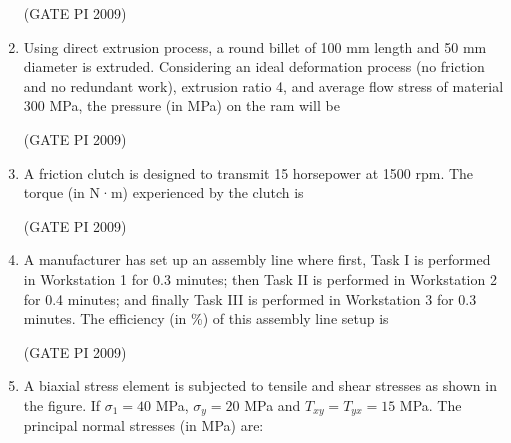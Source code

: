 \documentclass[journal,12pt,onecolumn]{IEEEtran}
\theoremstyle{remark}
\begin{document}
\begin{enumerate}
\hfill (GATE PI 2009)
\item Using direct extrusion process, a round billet of 100 mm length and 50 mm diameter is extruded. Considering an ideal deformation process (no friction and no redundant work), extrusion ratio 4, and average flow stress of material 300 MPa, the pressure (in MPa) on the ram will be
\begin{enumerate}
\end{enumerate}
\hfill (GATE PI 2009)
\item A friction clutch is designed to transmit 15 horsepower at 1500 rpm. The torque (in N·m) experienced by the clutch is
\begin{enumerate}
\end{enumerate}
\hfill (GATE PI 2009)
\item A manufacturer has set up an assembly line where first, Task I is performed in Workstation 1 for 0.3 minutes; then Task II is performed in Workstation 2 for 0.4 minutes; and finally Task III is performed in Workstation 3 for 0.3 minutes. The efficiency (in \%) of this assembly line setup is
\begin{enumerate}
\end{enumerate}
\hfill (GATE PI 2009)

\item A biaxial stress element is subjected to tensile and shear stresses as shown in the figure. If $\sigma_1 = 40$ MPa, $\sigma_y = 20$ MPa and $T_{xy} = T_{yx} = 15$ MPa. The principal normal stresses (in MPa) are:


\end{enumerate}
\end{document}
